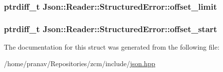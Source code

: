 \subsubsection[{\texorpdfstring{offset\+\_\+limit}{offset_limit}}]{\setlength{\rightskip}{0pt plus 5cm}ptrdiff\+\_\+t Json\+::\+Reader\+::\+Structured\+Error\+::offset\+\_\+limit}\hypertarget{structJson_1_1Reader_1_1StructuredError_ad76ac01aeb0ada7e882c2df5daa54c6e}{}\label{structJson_1_1Reader_1_1StructuredError_ad76ac01aeb0ada7e882c2df5daa54c6e}
\subsubsection[{\texorpdfstring{offset\+\_\+start}{offset_start}}]{\setlength{\rightskip}{0pt plus 5cm}ptrdiff\+\_\+t Json\+::\+Reader\+::\+Structured\+Error\+::offset\+\_\+start}\hypertarget{structJson_1_1Reader_1_1StructuredError_ac98af0da2d704be4b64a9572a682423b}{}\label{structJson_1_1Reader_1_1StructuredError_ac98af0da2d704be4b64a9572a682423b}


The documentation for this struct was generated from the following file\+:\begin{DoxyCompactItemize}
\item 
/home/pranav/\+Repositories/zcm/include/\hyperlink{json_8hpp}{json.\+hpp}\end{DoxyCompactItemize}
